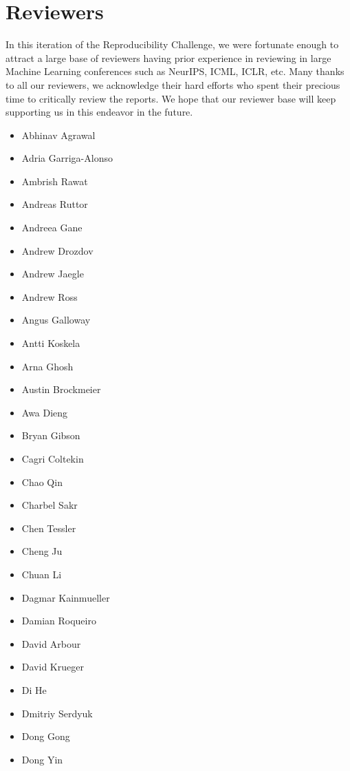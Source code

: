 \section{Reviewers}

In this iteration of the Reproducibility Challenge, we were fortunate enough to attract a large base of reviewers having prior experience in reviewing in large Machine Learning conferences such as NeurIPS, ICML, ICLR, etc. Many thanks to all our reviewers, we acknowledge their hard efforts who spent their precious time to critically review the reports. We hope that our reviewer base will keep supporting us in this endeavor in the future.

\begingroup
\fontsize{8pt}{7pt}\selectfont
\begin{multicols}{3}
\begin{itemize}[label={}]
    \item Abhinav Agrawal
    \item Adria Garriga-Alonso
    \item Ambrish Rawat
    \item Andreas Ruttor
    \item Andreea Gane
    \item Andrew Drozdov
    \item Andrew Jaegle
    \item Andrew Ross
    \item Angus Galloway
    \item Antti Koskela
    \item Arna Ghosh
    \item Austin Brockmeier
    \item Awa Dieng
    \item Bryan Gibson
    \item Cagri Coltekin
    \item Chao Qin
    \item Charbel Sakr
    \item Chen Tessler
    \item Cheng Ju
    \item Chuan Li
    \item Dagmar Kainmueller
    \item Damian Roqueiro
    \item David Arbour
    \item David Krueger
    \item Di He
    \item Dmitriy Serdyuk
    \item Dong Gong
    \item Dong Yin

\end{itemize}
\end{multicols}
